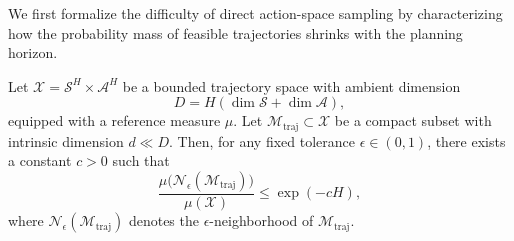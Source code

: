 

We first formalize the difficulty of direct action-space sampling
by characterizing how the probability mass of feasible trajectories
shrinks with the planning horizon.

\begin{lemma}
\label{lem:vanishing_mass}
Let $\mathcal{X} = \mathcal{S}^H \times \mathcal{A}^H$ be a bounded trajectory space
with ambient dimension
\[
D = H(\dim \mathcal{S} + \dim \mathcal{A}),
\]
equipped with a reference measure $\mu$.
Let $\mathcal{M}_{\mathrm{traj}} \subset \mathcal{X}$ be a compact subset
with intrinsic dimension $d \ll D$.
Then, for any fixed tolerance $\epsilon \in (0,1)$,
there exists a constant $c > 0$ such that
\begin{equation}
\frac{\mu\big(\mathcal{N}_\epsilon(\mathcal{M}_{\mathrm{traj}})\big)}{\mu(\mathcal{X})}
\le \exp(-cH),
\end{equation}
where $\mathcal{N}_\epsilon(\mathcal{M}_{\mathrm{traj}})$ denotes the $\epsilon$-neighborhood
of $\mathcal{M}_{\mathrm{traj}}$.
\end{lemma}

